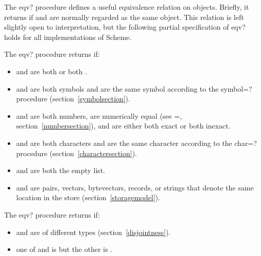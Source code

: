 \begin{entry}{%
}

The {\cf eqv?} procedure defines a useful equivalence relation on objects.
Briefly, it returns \schtrue{} if  and  are
normally regarded as the same object.  This relation is left slightly
open to interpretation, but the following partial specification of
{\cf eqv?} holds for all implementations of Scheme.

The {\cf eqv?} procedure returns \schtrue{} if:

\begin{itemize}
\item {} and  are both \schtrue{} or both \schfalse.

\item {} and  are both symbols and are the same
symbol according to the {\cf symbol=?} procedure
(section~\ref{symbolsection}).


\item {} and  are both numbers, are numerically
equal (see {\cf =}, section~\ref{numbersection}), and are either both
exact or both inexact.

\item {} and  are both characters and are the same
character according to the {\cf char=?} procedure
(section~\ref{charactersection}).

\item {} and  are both the empty list.

\item {} and  are pairs, vectors, bytevectors, records,
or strings that denote the same location in the store
(section~\ref{storagemodel}).
\end{itemize}

The {\cf eqv?} procedure returns \schfalse{} if:

\begin{itemize}
\item {} and  are of different types
(section~\ref{disjointness}).

\item one of  and  is \schtrue{} but the other is
\schfalse{}.


\end{itemize}
\end{entry}
